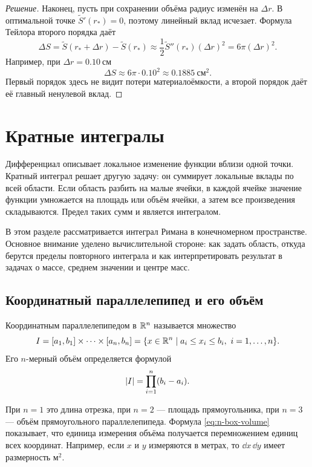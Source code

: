 \begin{proof}[Решение]
Наконец, пусть при сохранении объёма радиус изменён на \(\Delta r\). В оптимальной точке \(\widetilde S'(r_*)=0\), поэтому линейный вклад исчезает. Формула Тейлора второго порядка даёт
\[
\Delta S
=
\widetilde S(r_*+\Delta r)-\widetilde S(r_*)
\approx
\frac12\widetilde S''(r_*)(\Delta r)^2
=6\pi(\Delta r)^2.
\]
Например, при \(\Delta r=0.10\ \text{см}\)
\[
\Delta S
\approx
6\pi\cdot0.10^2
\approx0.1885\ \text{см}^2.
\]
Первый порядок здесь не видит потери материалоёмкости, а второй порядок даёт её главный ненулевой вклад.
\end{proof}


\section{Кратные интегралы}
\label{sec:multiple-integrals}

Дифференциал описывает локальное изменение функции вблизи одной точки. Кратный интеграл решает другую задачу: он суммирует локальные вклады по всей области. Если область разбить на малые ячейки, в каждой ячейке значение функции умножается на площадь или объём ячейки, а затем все произведения складываются. Предел таких сумм и является интегралом.

В этом разделе рассматривается интеграл Римана в конечномерном пространстве. Основное внимание уделено вычислительной стороне: как задать область, откуда берутся пределы повторного интеграла и как интерпретировать результат в задачах о массе, среднем значении и центре масс.

\subsection{Координатный параллелепипед и его объём}

\begin{definition}
Координатным параллелепипедом в $\mathbb{R}^n$ называется множество
\[
I=[a_1,b_1]\times\cdots\times[a_n,b_n]
=
\{x\in\mathbb{R}^n\mid a_i\leq x_i\leq b_i,
\ i=1,\dots,n\}.
\]
Его $n$-мерный объём определяется формулой
\begin{equation}
\lvert I\rvert
=
\prod_{i=1}^{n}(b_i-a_i).
\label{eq:n-box-volume}
\end{equation}
\end{definition}

При $n=1$ это длина отрезка, при $n=2$ --- площадь прямоугольника, при $n=3$ --- объём прямоугольного параллелепипеда. Формула \eqref{eq:n-box-volume} показывает, что единица измерения объёма получается перемножением единиц всех координат. Например, если $x$ и $y$ измеряются в метрах, то $\dd x\,\dd y$ имеет размерность $\text{м}^2$.

